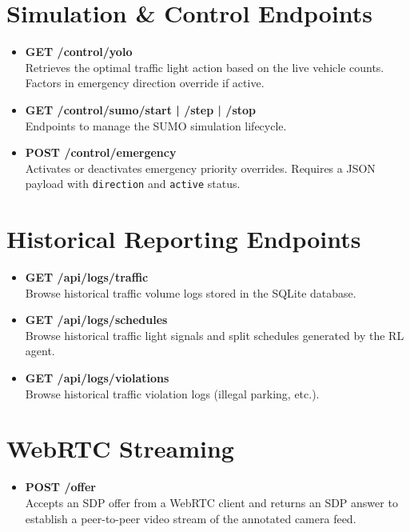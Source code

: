 \documentclass[12pt,a4paper]{report}
\begin{document}
\section{Simulation \& Control Endpoints}
\begin{itemize}
    \item \textbf{GET /control/yolo} \\
    Retrieves the optimal traffic light action based on the live vehicle counts. Factors in emergency direction override if active.
    \item \textbf{GET /control/sumo/start | /step | /stop} \\
    Endpoints to manage the SUMO simulation lifecycle.
    \item \textbf{POST /control/emergency} \\
    Activates or deactivates emergency priority overrides. Requires a JSON payload with \texttt{direction} and \texttt{active} status.
\end{itemize}

\section{Historical Reporting Endpoints}
\begin{itemize}
    \item \textbf{GET /api/logs/traffic} \\
    Browse historical traffic volume logs stored in the SQLite database.
    \item \textbf{GET /api/logs/schedules} \\
    Browse historical traffic light signals and split schedules generated by the RL agent.
    \item \textbf{GET /api/logs/violations} \\
    Browse historical traffic violation logs (illegal parking, etc.).
\end{itemize}

\section{WebRTC Streaming}
\begin{itemize}
    \item \textbf{POST /offer} \\
    Accepts an SDP offer from a WebRTC client and returns an SDP answer to establish a peer-to-peer video stream of the annotated camera feed.
\end{itemize}
\end{document}
